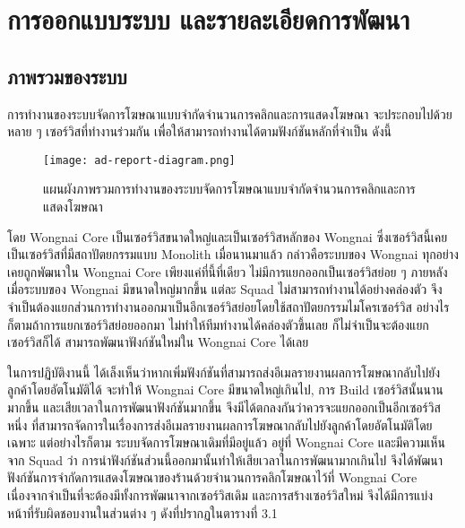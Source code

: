 \chapter{การออกแบบระบบ และรายละเอียดการพัฒนา}
\label{chapter:system-detail}
\section{ภาพรวมของระบบ}
การทำงานของระบบจัดการโฆษณาแบบจำกัดจำนวนการคลิกและการแสดงโฆษณา จะประกอบไปด้วยหลาย ๆ เซอร์วิสที่ทำงานร่วมกัน เพื่อให้สามารถทำงานได้ตามฟังก์ชันหลักที่จำเป็น ดังนี้

\begin{figure}[!h]
	\centering
	\texttt{[image: ad-report-diagram.png]}  
	\caption{แผนผังภาพรวมการทำงานของระบบจัดการโฆษณาแบบจำกัดจำนวนการคลิกและการแสดงโฆษณา}
	\label{Fig:adreport-diagram}
\end{figure}
	
โดย Wongnai Core เป็นเซอร์วิสขนาดใหญ่และเป็นเซอร์วิสหลักของ Wongnai ซึ่งเซอร์วิสนี้เคยเป็นเซอร์วิสที่มีสถาปัตยกรรมแบบ Monolith เมื่อนานมาแล้ว กล่าวคือระบบของ Wongnai ทุกอย่างเคยถูกพัฒนาใน Wongnai Core เพียงแค่ที่นี้ที่เดียว ไม่มีการแยกออกเป็นเซอร์วิสย่อย ๆ ภายหลังเมื่อระบบของ Wongnai มีขนาดใหญ่มากขึ้น แต่ละ Squad ไม่สามารถทำงานได้อย่างคล่องตัว จึงจำเป็นต้องแยกส่วนการทำงานออกมาเป็นอีกเซอร์วิสย่อยโดยใช้สถาปัตยกรรมไมโครเซอร์วิส อย่างไรก็ตามถ้าการแยกเซอร์วิสย่อยออกมา ไม่ทำให้ทีมทำงานได้คล่องตัวขึ้นเลย ก็ไม่จำเป็นจะต้องแยกเซอร์วิสก็ได้ สามารถพัฒนาฟังก์ชันใหม่ใน Wongnai Core ได้เลย 

ในการปฏิบัติงานนี้ ได้เล็งเห็นว่าหากเพิ่มฟังก์ชันที่สามารถส่งอีเมลรายงานผลการโฆษณากลับไปยังลูกค้าโดยอัตโนมัติได้ จะทำให้ Wongnai Core มีขนาดใหญ่เกินไป, การ Build เซอร์วิสนั้นนานมากขึ้น และเสียเวลาในการพัฒนาฟังก์ชันมากขึ้น จึงมีได้ตกลงกันว่าควรจะแยกออกเป็นอีกเซอร์วิสหนึ่ง ที่สามารถจัดการในเรื่องการส่งอีเมลรายงานผลการโฆษณากลับไปยังลูกค้าโดยอัตโนมัติโดยเฉพาะ แต่อย่างไรก็ตาม ระบบจัดการโฆษณาเดิมที่มีอยู่แล้ว อยู่ที่ Wongnai Core และมีความเห็นจาก Squad ว่า การนำฟังก์ชันส่วนนี้ออกมานั้นทำให้เสียเวลาในการพัฒนามากเกินไป จึงได้พัฒนาฟังก์ชันการจำกัดการแสดงโฆษณาของร้านด้วยจำนวนการคลิกโฆษณาไว้ที่ Wongnai Core เนื่องจากจำเป็นที่จะต้องมีทั้งการพัฒนาจากเซอร์วิสเดิม และการสร้างเซอร์วิสใหม่ จึงได้มีการแบ่งหน้าที่รับผิดชอบงานในส่วนต่าง ๆ ดังที่ปรากฏในตารางที่ 3.1

